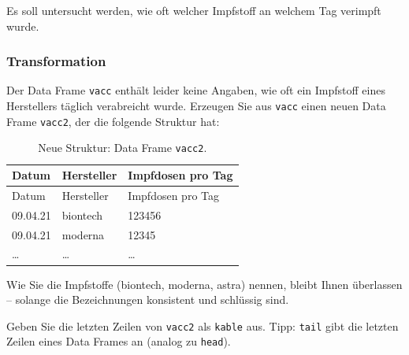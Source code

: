 \documentclass[
]{article}
\begin{document}
Es soll untersucht werden, wie oft welcher Impfstoff an welchem Tag
verimpft wurde.

\hypertarget{transformation}{%
\subsubsection{Transformation}\label{transformation}}

Der Data Frame \texttt{vacc} enthält leider keine Angaben, wie oft ein
Impfstoff eines Herstellers täglich verabreicht wurde. Erzeugen Sie aus
\texttt{vacc} einen neuen Data Frame \texttt{vacc2}, der die folgende
Struktur hat:

\begin{longtable}[]{@{}lll@{}}
\caption{Neue Struktur: Data Frame \texttt{vacc2}.}\tabularnewline
\toprule()
Datum & Hersteller & Impfdosen pro Tag \\
\midrule()
\endfirsthead
\toprule()
Datum & Hersteller & Impfdosen pro Tag \\
\midrule()
\endhead
09.04.21 & biontech & 123456 \\
09.04.21 & moderna & 12345 \\
\ldots{} & \ldots{} & \ldots{} \\
\bottomrule()
\end{longtable}

Wie Sie die Impfstoffe (biontech, moderna, astra) nennen, bleibt Ihnen
überlassen -- solange die Bezeichnungen konsistent und schlüssig sind.

Geben Sie die letzten Zeilen von \texttt{vacc2} als \texttt{kable} aus.
Tipp: \texttt{tail} gibt die letzten Zeilen eines Data Frames an (analog
zu \texttt{head}).
\end{document}
